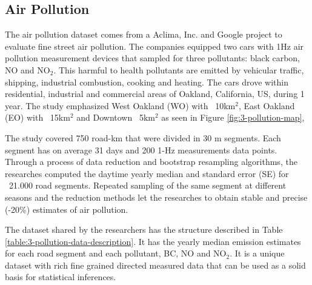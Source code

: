 \subsection{Air Pollution}


The air pollution dataset comes from a Aclima, Inc. and Google project to evaluate fine street air pollution. The companies equipped two cars with 1Hz air pollution measurement devices that sampled for three pollutants: black carbon, NO and NO$_2$. This harmful to health pollutants are emitted by vehicular traffic, shipping, industrial combustion, cooking and heating. The cars drove within residential, industrial and commercial areas of Oakland, California, US, during 1 year. The study emphasized West Oakland (WO) with ~10km$^2$, East Oakland (EO) with ~15km$^2$ and Downtown ~5km$^2$ as seen in Figure \ref{fig:3-pollution-map}, 

The study covered 750 road-km that were divided in 30 m segments. Each segment has on average 31 days and 200 1-Hz measurements data points. Through a process of data reduction and bootstrap resampling algorithms, the researches computed the daytime yearly median and standard error (SE) for ~21.000 road segments. Repeated sampling of the same segment at different seasons and the reduction methods let the researches to obtain stable and precise (-20\%) estimates of air pollution.

The dataset shared by the researchers has the structure described in Table \ref{table:3-pollution-data-description}. It has the yearly median emission estimates for each road segment and each pollutant, BC, NO and NO$_2$. It is a unique dataset with rich fine grained directed measured data that can be used as a solid basis for statistical inferences.

